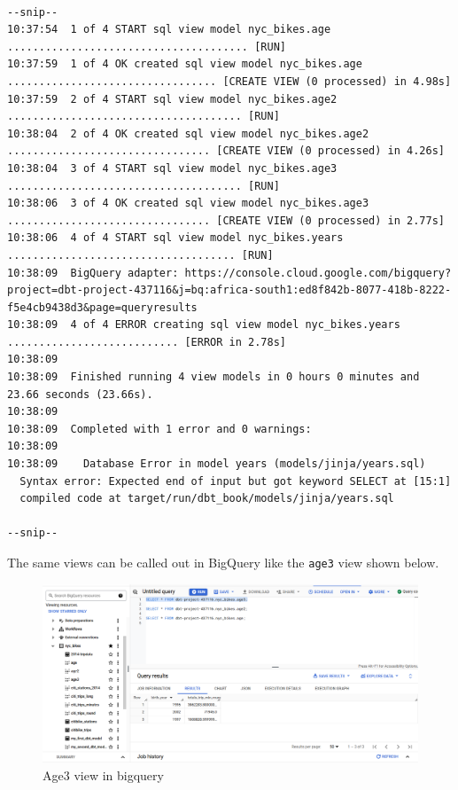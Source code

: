 \documentclass[
]{book}
\begin{document}
\begin{verbatim}

--snip--
10:37:54  1 of 4 START sql view model nyc_bikes.age ...................................... [RUN]
10:37:59  1 of 4 OK created sql view model nyc_bikes.age ................................. [CREATE VIEW (0 processed) in 4.98s]
10:37:59  2 of 4 START sql view model nyc_bikes.age2 ..................................... [RUN]
10:38:04  2 of 4 OK created sql view model nyc_bikes.age2 ................................ [CREATE VIEW (0 processed) in 4.26s]
10:38:04  3 of 4 START sql view model nyc_bikes.age3 ..................................... [RUN]
10:38:06  3 of 4 OK created sql view model nyc_bikes.age3 ................................ [CREATE VIEW (0 processed) in 2.77s]
10:38:06  4 of 4 START sql view model nyc_bikes.years .................................... [RUN]
10:38:09  BigQuery adapter: https://console.cloud.google.com/bigquery?project=dbt-project-437116&j=bq:africa-south1:ed8f842b-8077-418b-8222-f5e4cb9438d3&page=queryresults
10:38:09  4 of 4 ERROR creating sql view model nyc_bikes.years ........................... [ERROR in 2.78s]
10:38:09  
10:38:09  Finished running 4 view models in 0 hours 0 minutes and 23.66 seconds (23.66s).
10:38:09  
10:38:09  Completed with 1 error and 0 warnings:
10:38:09  
10:38:09    Database Error in model years (models/jinja/years.sql)
  Syntax error: Expected end of input but got keyword SELECT at [15:1]
  compiled code at target/run/dbt_book/models/jinja/years.sql
  
--snip--
\end{verbatim}

The same views can be called out in BigQuery like the \texttt{age3} view shown below.

\begin{figure}
\centering
\includegraphics{./images/age3_bigquery.png}
\caption{Age3 view in bigquery}
\end{figure}
\end{document}
